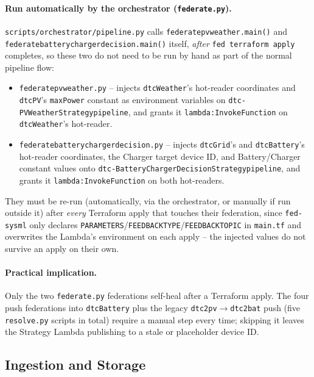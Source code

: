 \documentclass[11pt]{article}
\renewcommand{\_}{\textunderscore\allowbreak}
\begin{document}
\paragraph{Run automatically by the orchestrator (\texttt{federate\_*.py}).}
\texttt{scripts/orchestrator/pipeline.py} calls
\texttt{federate\_pv\_weather.main()} and
\texttt{federate\_battery\_charger\_decision.main()} itself, \emph{after}
\texttt{fed terraform apply} completes, so these two do not need to be run
by hand as part of the normal pipeline flow:
\begin{itemize}[nosep]
  \item \texttt{federate\_pv\_weather.py} -- injects
        \texttt{dtcWeather}'s hot-reader coordinates and \texttt{dtcPV}'s
        \texttt{maxPower} constant as environment variables on
        \texttt{dtc-PVWeatherStrategy\_pipeline}, and grants it
        \texttt{lambda:InvokeFunction} on \texttt{dtcWeather}'s hot-reader.
  \item \texttt{federate\_battery\_charger\_decision.py} -- injects
        \texttt{dtcGrid}'s and \texttt{dtcBattery}'s hot-reader coordinates,
        the Charger target device ID, and Battery/Charger constant values
        onto \texttt{dtc-BatteryChargerDecisionStrategy\_pipeline}, and
        grants it \texttt{lambda:InvokeFunction} on both hot-readers.
\end{itemize}
They must be re-run (automatically, via the orchestrator, or manually if run
outside it) after \emph{every} Terraform apply that touches their
federation, since \texttt{fed-sysml} only declares
\texttt{PARAMETERS}/\texttt{FEEDBACK\_TYPE}/\texttt{FEEDBACK\_TOPIC} in
\texttt{main.tf} and overwrites the Lambda's environment on each apply --
the injected values do not survive an apply on their own.

\paragraph{Practical implication.} Only the two \texttt{federate\_*.py}
federations self-heal after a Terraform apply. The four push federations
into \texttt{dtcBattery} plus the legacy \texttt{dtc2pv}$\to$\texttt{dtc2bat}
push (five \texttt{resolve\_*.py} scripts in total) require a manual step
every time; skipping it leaves the Strategy Lambda publishing to a stale or
placeholder device ID.

\subsection{Ingestion and Storage}
\end{document}

